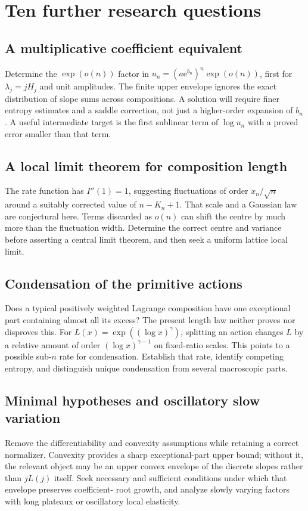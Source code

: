 \documentclass[11pt,a4paper]{article}
\numberwithin{equation}{section}
\theoremstyle{definition}
\theoremstyle{remark}
\newcommand{\ee}{\mathrm e}
\begin{document}
\section{Ten further research questions}
\label{sec:future}

\subsection{A multiplicative coefficient equivalent}
Determine the $\exp(o(n))$ factor in
$u_n=(a\ee^{b_n})^n\exp(o(n))$, first for $\lambda_j=jH_j$ and unit
amplitudes. The finite upper envelope ignores the exact distribution of
slope sums across compositions. A solution will require finer entropy
estimates and a saddle correction, not just a higher-order expansion of
$b_n$. A useful intermediate target is the first sublinear term of
$\log u_n$ with a proved error smaller than that term.

\subsection{A local limit theorem for composition length}
The rate function has $I''(1)=1$, suggesting fluctuations of order
$x_n/\sqrt n$ around a suitably corrected value of $n-K_n+1$.
That scale and a Gaussian law are conjectural here. Terms discarded as
$o(n)$ can shift the centre by much more than the fluctuation width.
Determine the correct centre and variance before asserting a central
limit theorem, and then seek a uniform lattice local limit.

\subsection{Condensation of the primitive actions}
Does a typical positively weighted Lagrange composition have one
exceptional part containing almost all its excess? The present length
law neither proves nor disproves this. For $L(x)=\exp((\log x)^\gamma)$,
splitting an action changes $L$ by a relative amount of order
$(\log x)^{\gamma-1}$ on fixed-ratio scales. This points to a possible
sub-$n$ rate for condensation. Establish that rate, identify competing
entropy, and distinguish unique condensation from several macroscopic
parts.

\subsection{Minimal hypotheses and oscillatory slow variation}
Remove the differentiability and convexity assumptions while retaining a
correct normalizer. Convexity provides a sharp exceptional-part upper
bound; without it, the relevant object may be an upper convex envelope
of the discrete slopes rather than $jL(j)$ itself. Seek necessary and
sufficient conditions under which that envelope preserves coefficient-
root growth, and analyze slowly varying factors with long plateaux or
oscillatory local elasticity.
\end{document}
